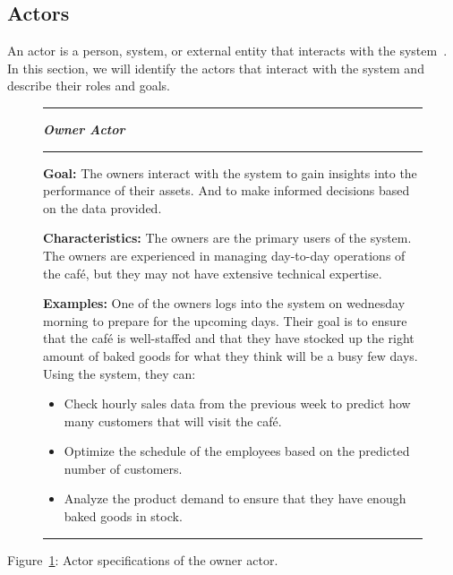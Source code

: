\subsection{Actors}\label{subsec:actors}
An actor is a person, system, or external entity that interacts with the system~\cite{mathiassen2018}.
In this section, we will identify the actors that interact with the system and describe their roles and goals.

\begin{figure}[H]
    \noindent
    \rule{\textwidth}{0.4pt}
    \begin{center}
    \noindent
    \textit{\textbf{Owner Actor}}
    \end{center}

    \noindent
    \rule{\textwidth}{0.4pt}

    \noindent
    \textbf{Goal:} The owners interact with the system to gain insights into the performance of their assets.
    And to make informed decisions based on the data provided.
    \newline

    \noindent
    \textbf{Characteristics:} The owners are the primary users of the system.
    The owners are experienced in managing day-to-day operations of the café, but they may not have extensive technical
    expertise.
    \newline

    \noindent
    \textbf{Examples:} One of the owners logs into the system on wednesday morning to prepare for the upcoming days.
    Their goal is to ensure that the café is well-staffed and that they have stocked up the right amount of baked goods
    for what they think will be a busy few days.
    Using the system, they can:

    \begin{itemize}
        \item Check hourly sales data from the previous week to predict how many customers that will
        visit the café.
        \item Optimize the schedule of the employees based on the predicted number of customers.
        \item Analyze the product demand to ensure that they have enough baked goods in stock.
    \end{itemize}
    \noindent
    \rule{\textwidth}{0.4pt}\label{fig:actor-owner}
\end{figure}

Figure~\ref{fig:actor-owner}: Actor specifications of the owner actor.
\pagebreak


